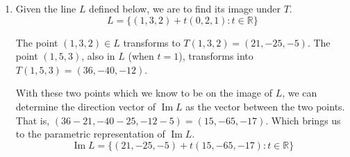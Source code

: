 \documentclass{article}
\newenvironment{answers}{ %
	\begin{enumerate}
		\setlength{\itemsep}{\bigskipamount}
}{\end{enumerate}}
\newcommand{\R}{\mathbb{R}}
\newcommand{\img}{\operatorname{Im}}
\begin{document}
\begin{answers}
\begin{enumerate}
			\item
				Given the line \(L\) defined below, we are to find its image under \(T\).
				\begin{equation*}
					L = \{(1,3,2) + t(0,2,1) : t \in \R\}
				\end{equation*}

				The point \((1,3,2) \in L\) transforms to \(T(1,3,2) = (21, -25, -5)\). The point \((1,5,3)\), also in \(L\) (when \(t=1\)), transforms into \(T(1,5,3) = (36, -40, -12)\).

				With these two points which we know to be on the image of \(L\), we can determine the direction vector of \(\img L\) as the vector between the two points. That is, \((36-21, -40-25, -12-5) = (15, -65, -17)\). Which brings us to the parametric representation of \(\img L\).
				\begin{equation*}
					\img L = \{(21, -25, -5) + t(15, -65, -17) : t \in \R\}
				\end{equation*}
		\end{enumerate}
\end{answers}
\end{document}

